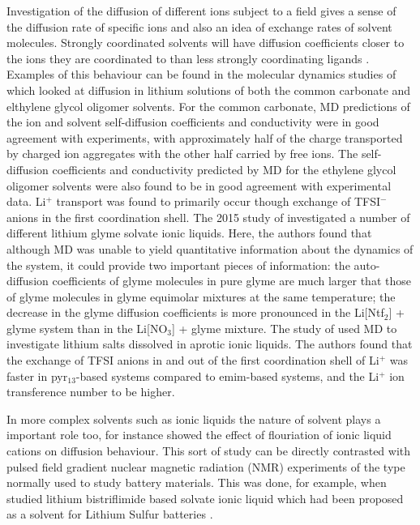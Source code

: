 \documentclass[../main.tex]{subfiles}
\begin{document}
Investigation of the diffusion of different ions subject to a field gives a sense of the diffusion rate of specific ions and also an idea of exchange rates of solvent molecules. Strongly coordinated solvents will have diffusion coefficients closer to the ions they are coordinated to than less strongly coordinating ligands \cite{shimizu_structural_2015, lesch_influence_2015, borodin_litfsi_2006,borodin_li_2006,borodin_li_2007}. Examples of this behaviour can be found in the molecular dynamics studies of \citeauthor{borodin_li_2006} which looked at diffusion in lithium solutions of both the common carbonate\cite{borodin_litfsi_2006} and elthylene glycol oligomer solvents\cite{borodin_li_2006}. For the common carbonate, MD predictions of the ion and solvent self-diffusion coefficients and conductivity were in good agreement with experiments, with approximately half of the charge transported by charged ion aggregates with the other half carried by free ions.\cite{borodin_litfsi_2006} The self-diffusion coefficients and conductivity predicted by MD for the ethylene glycol oligomer solvents were also found to be in good agreement with experimental data. Li$^+$ transport was found to primarily occur though exchange of TFSI$^-$ anions in the first coordination shell.\cite{borodin_li_2006} The 2015 study of \citeauthor{shimizu_structural_2015} investigated a number of different lithium glyme solvate ionic liquids\cite{shimizu_structural_2015}. Here, the authors found that although MD was unable to yield quantitative information about the dynamics of the system, it could provide two important pieces of information: the auto-diffusion coefficients of glyme molecules in pure glyme are much larger that those of glyme molecules in glyme equimolar mixtures at the same temperature; the decrease in the glyme diffusion coefficients is more pronounced in the Li[Ntf$_2$] + glyme system than in the Li[NO$_3$] + glyme mixture.\cite{shimizu_structural_2015} The study of \citeauthor{lesch_influence_2015} used MD to investigate lithium salts dissolved in aprotic ionic liquids.\cite{lesch_influence_2015} The authors found that the exchange of TFSI anions in and out of the first coordination shell of Li$^+$ was faster in pyr$_{13}$-based systems compared to emim-based systems, and the Li$^+$ ion transference number to be higher. \cite{lesch_influence_2015}

In more complex solvents such as ionic liquids the nature of solvent plays a important role too, for instance \citeauthor{borodin_li_2007} showed the effect of flouriation of ionic liquid cations on diffusion behaviour\cite{borodin_li_2007}. This sort of study can be directly contrasted with pulsed field gradient nuclear magnetic radiation (NMR) experiments of the type normally used to study battery materials. This was done, for example, when \citeauthor{shimizu_structural_2015} studied lithium bistriflimide based solvate ionic liquid which had been proposed as a solvent for Lithium Sulfur batteries \cite{shimizu_structural_2015}.
\end{document}
